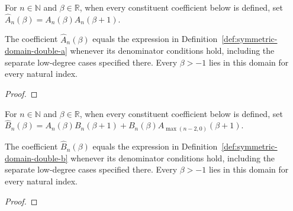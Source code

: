 \begin{supporting}
\begin{definition}
\label{def:symmetric-domain-double-a}
\leanok
For $n\in\mathbb N$ and $\beta\in\mathbb R$, when every constituent coefficient below is defined, set $\widehat A_n(\beta)=A_n(\beta)A_n(\beta+1)$.
\end{definition}

\begin{theorem}
\label{thm:symmetric-domain-double-a}
\leanok
The coefficient $\widehat A_n(\beta)$ equals the expression in Definition~\ref{def:symmetric-domain-double-a} whenever its denominator conditions hold, including the separate low-degree cases specified there.
Every $\beta>-1$ lies in this domain for every natural index.
\end{theorem}
\begin{proof}
\leanok
\end{proof}

\begin{definition}
\label{def:symmetric-domain-double-b}
\leanok
For $n\in\mathbb N$ and $\beta\in\mathbb R$, when every constituent coefficient below is defined, set $\widehat B_n(\beta)=A_n(\beta)B_n(\beta+1)+B_n(\beta)A_{\max(n-2,0)}(\beta+1)$.
\end{definition}

\begin{theorem}
\label{thm:symmetric-domain-double-b}
\leanok
The coefficient $\widehat B_n(\beta)$ equals the expression in Definition~\ref{def:symmetric-domain-double-b} whenever its denominator conditions hold, including the separate low-degree cases specified there.
Every $\beta>-1$ lies in this domain for every natural index.
\end{theorem}
\begin{proof}
\leanok
\end{proof}


\end{supporting}
